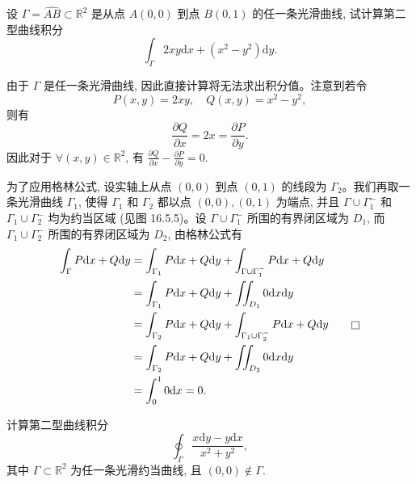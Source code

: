\begin{example}\label{example:ma-16-5-1}
设 $\Gamma=\widehat{AB}\subset\mathbb R^2$ 是从点 $A(0,0)$ 到点 $B(0,1)$ 的任一条光滑曲线, 试计算第二型曲线积分
\[
  \int_\Gamma 2xy\mathrm dx+(x^2-y^2)\mathrm dy.
\]
\end{example}


\begin{solve}
由于 $\Gamma$ 是任一条光滑曲线, 因此直接计算将无法求出积分值。注意到若令
\[
  P(x,y)=2xy,\quad Q(x,y)=x^2-y^2,
\]
则有
\[
  \frac{\partial Q}{\partial x}=2x=\frac{\partial P}{\partial y}.
\]
因此对于 $\forall(x,y)\in\mathbb R^2$, 有 $\frac{\partial Q}{\partial x}-\frac{\partial P}{\partial y}=0$.

为了应用格林公式, 设实轴上从点 $(0,0)$ 到点 $(0,1)$ 的线段为 $\Gamma_2$。我们再取一条光滑曲线 $\Gamma_1$, 使得 $\Gamma_1$ 和 $\Gamma_2$ 都以点 $(0,0),(0,1)$ 为端点, 并且 $\Gamma\cup\Gamma_1^-$ 和 $\Gamma_1\cup\Gamma_2^-$ 均为约当区域 (见图 16.5.5)。设 $\Gamma\cup\Gamma_1^-$ 所围的有界闭区域为 $D_1$, 而 $\Gamma_1\cup\Gamma_2^-$ 所围的有界闭区域为 $D_2$, 由格林公式有
\[
\begin{aligned}
  \int_\Gamma P\mathrm dx+Q\mathrm dy
  &=\int_{\Gamma_1}P\mathrm dx+Q\mathrm dy+\int_{\Gamma\cup\Gamma_1^-}P\mathrm dx+Q\mathrm dy\\
  &=\int_{\Gamma_1}P\mathrm dx+Q\mathrm dy+\iint_{D_1}0\mathrm dx\mathrm dy\\
  &=\int_{\Gamma_2}P\mathrm dx+Q\mathrm dy+\int_{\Gamma_1\cup\Gamma_2^-}P\mathrm dx+Q\mathrm dy\\
  &=\int_{\Gamma_2}P\mathrm dx+Q\mathrm dy+\iint_{D_2}0\mathrm dx\mathrm dy\\
  &=\int_0^1 0\mathrm dx=0.
\end{aligned}
\qedhere
\]
\end{solve}


\begin{example}\label{example:ma-16-5-2}
计算第二型曲线积分
\[
  \oint_\Gamma\frac{x\mathrm dy-y\mathrm dx}{x^2+y^2},
\]
其中 $\Gamma\subset\mathbb R^2$ 为任一条光滑约当曲线, 且 $(0,0)\notin\Gamma$.
\end{example}


